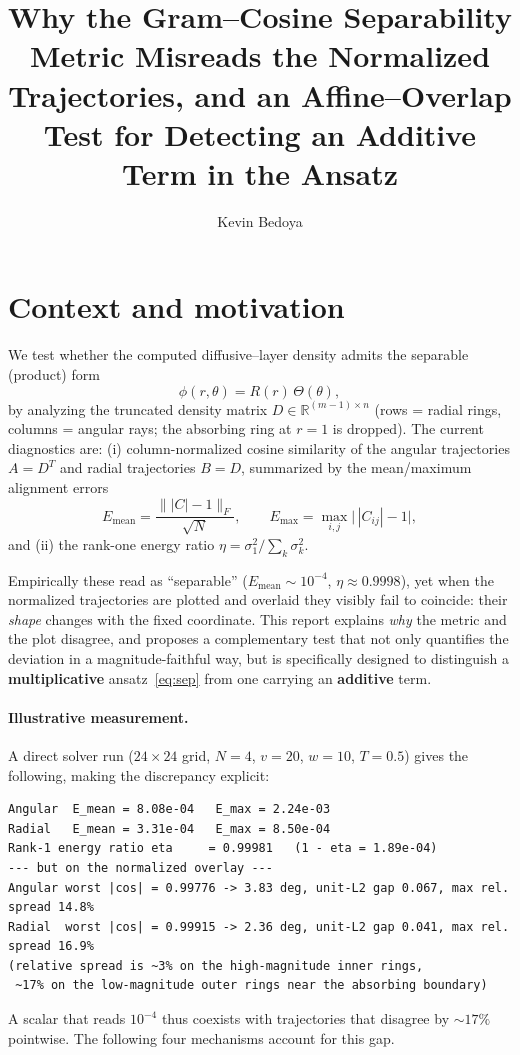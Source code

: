 \documentclass{article}
\title{Why the Gram--Cosine Separability Metric Misreads the Normalized
Trajectories, and an Affine--Overlap Test for Detecting an Additive Term in
the Ansatz}
\author{Kevin Bedoya}
\begin{document}
\maketitle

\section{Context and motivation}

We test whether the computed diffusive--layer density admits the separable
(product) form
\begin{equation}
\phi(r,\theta) = R(r)\,\Theta(\theta),
\label{eq:sep}
\end{equation}
by analyzing the truncated density matrix $D\in\mathbb{R}^{(m-1)\times n}$
(rows = radial rings, columns = angular rays; the absorbing ring at $r=1$ is
dropped). The current diagnostics are: (i) column-normalized cosine
similarity of the angular trajectories $A=D^{T}$ and radial trajectories
$B=D$, summarized by the mean/maximum alignment errors
\begin{equation}
E_{\mathrm{mean}}=\frac{\bigl\||C|-1\bigr\|_{F}}{\sqrt{N}},
\qquad
E_{\max}=\max_{i,j}\bigl|\,|C_{ij}|-1\bigr|,
\label{eq:Emetrics}
\end{equation}
and (ii) the rank-one energy ratio
$\eta=\sigma_{1}^{2}/\sum_{k}\sigma_{k}^{2}$.

Empirically these read as ``separable'' ($E_{\mathrm{mean}}\sim10^{-4}$,
$\eta\approx0.9998$), yet when the normalized trajectories are plotted and
overlaid they visibly fail to coincide: their \emph{shape} changes with the
fixed coordinate. This report explains \emph{why} the metric and the plot
disagree, and proposes a complementary test that not only quantifies the
deviation in a magnitude-faithful way, but is specifically designed to
distinguish a \textbf{multiplicative} ansatz~\eqref{eq:sep} from one carrying
an \textbf{additive} term.

\paragraph{Illustrative measurement.} A direct solver run
($24\times24$ grid, $N=4$, $v=20$, $w=10$, $T=0.5$) gives the following,
making the discrepancy explicit:
\begin{lstlisting}
Angular  E_mean = 8.08e-04   E_max = 2.24e-03
Radial   E_mean = 3.31e-04   E_max = 8.50e-04
Rank-1 energy ratio eta     = 0.99981   (1 - eta = 1.89e-04)
--- but on the normalized overlay ---
Angular worst |cos| = 0.99776 -> 3.83 deg, unit-L2 gap 0.067, max rel. spread 14.8%
Radial  worst |cos| = 0.99915 -> 2.36 deg, unit-L2 gap 0.041, max rel. spread 16.9%
(relative spread is ~3% on the high-magnitude inner rings,
 ~17% on the low-magnitude outer rings near the absorbing boundary)
\end{lstlisting}
A scalar that reads $10^{-4}$ thus coexists with trajectories that disagree
by $\sim17\%$ pointwise. The following four mechanisms account for this gap.
\end{document}
